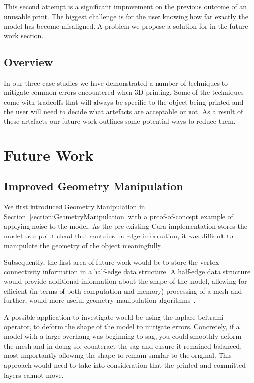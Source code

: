 \documentclass[pdftex, 11pt]{report} %
\begin{document}
This second attempt is a significant improvement on the previous outcome of an unusable print. The biggest challenge is for the user knowing how far exactly the model has become misaligned. A problem we propose a solution for in the future work section.   


\section{Overview}
In our three case studies we have demonstrated a number of techniques to mitigate common errors encountered when 3D printing.  Some of the techniques come with tradeoffs that will always be specific to the object being printed and the user will need to decide what artefacts are acceptable or not. As a result of these artefacts our future work outlines some potential ways to reduce them.  




\chapter{Future Work}
\section{Improved Geometry Manipulation}
We first introduced Geometry Manipulation in Section~\ref{section:GeometryManipulation} with a proof-of-concept example of applying noise to the model. As the pre-existing Cura implementation stores the model as a point cloud that contains no edge information, it was difficult to manipulate the geometry of the object meaningfully. 

Subsequently, the first area of future work would be to store the vertex connectivity information in a half-edge data structure. A half-edge data structure would provide additional information about the shape of the model, allowing for efficient (in terms of both computation and memory) processing of a mesh and further, would more useful geometry manipulation algorithms~\cite{Botsch2010}.

A possible application to investigate would be using the laplace-beltrami operator, to deform the shape of the model to mitigate errors. Concretely, if a model with a large overhang was beginning to sag, you could smoothly deform the mesh and in doing so, counteract the sag and ensure it remained balanced, most importantly allowing the shape to remain similar to the original. This approach would need to take into consideration that the printed and committed layers cannot move. 
\end{document}
